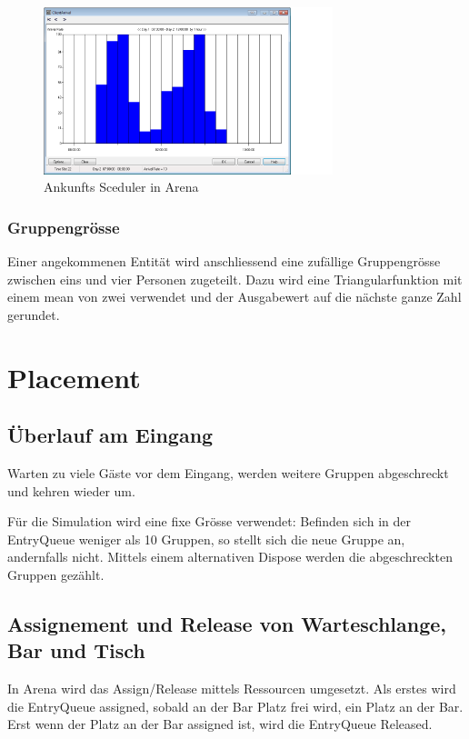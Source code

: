 \documentclass[ngerman,a4paper,12pt]{scrreprt}
\begin{document}
			\begin{figure}[H]
				\centering
					\includegraphics[width=0.75\textwidth]{img/scheduler.png}
					\caption[Arrival Sceduler in Arena]{Ankunfts Sceduler in Arena}
					\label{arrivalSceduler}
			\end{figure}
	
			\subsubsection{Gruppengrösse}
			Einer angekommenen Entität wird anschliessend eine zufällige Gruppengrösse zwischen eins und vier Personen zugeteilt. Dazu wird eine Triangularfunktion mit einem mean von zwei verwendet und der Ausgabewert auf die nächste ganze Zahl gerundet.
			
	
	\section{Placement}		
		\subsection{Überlauf am Eingang}
			Warten zu viele Gäste vor dem Eingang, werden weitere Gruppen abgeschreckt und kehren wieder um.
		
			Für die Simulation wird eine fixe Grösse verwendet: 			Befinden sich in der EntryQueue weniger als 10 Gruppen, so stellt sich die neue Gruppe an, andernfalls nicht. Mittels einem alternativen Dispose werden die abgeschreckten Gruppen gezählt.
			
			
		\subsection{Assignement und Release von Warteschlange, Bar und Tisch}
			In Arena wird das Assign/Release mittels Ressourcen umgesetzt. Als erstes wird die EntryQueue assigned, sobald an der Bar Platz frei wird, ein Platz an der Bar. Erst wenn der Platz an der Bar assigned ist, wird die EntryQueue Released. 
		
\end{document}
